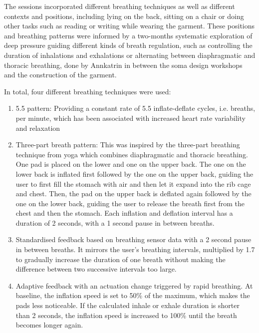 
The sessions incorporated different breathing techniques as well as different contexts and positions, including lying on the back, sitting on a chair or doing other tasks such as reading or writing while wearing the garment. These positions and breathing patterns were informed by a two-months systematic exploration of deep pressure guiding different kinds of breath regulation, such as controlling the duration of inhalations and exhalations or alternating between diaphragmatic and thoracic breathing, done by Annkatrin in between the soma design workshops and the construction of the garment.

In total, four different breathing techniques were used: 
\begin{enumerate}
    \item 5.5 pattern: Providing a constant rate of 5.5 inflate-deflate cycles, i.e. breaths, per minute, which has been associated with increased heart rate variability and relaxation \cite{lin_breathing_2014} 
    \item Three-part breath pattern: This was inspired by the three-part breathing technique from yoga \cite{sengupta_health_2012} which combines diaphragmatic and thoracic breathing. One pad is placed on the lower and one on the upper back. The one on the lower back is inflated first followed by the one on the upper back, guiding the user to first fill the stomach with air and then let it expand into the rib cage and chest. Then, the pad on the upper back is deflated again followed by the one on the lower back, guiding the user to release the breath first from the chest and then the stomach. Each inflation and deflation interval has a duration of 2 seconds, with a 1 second pause in between breaths. 
    \item Standardised feedback based on breathing sensor data with a 2 second pause in between breaths. It mirrors the user’s breathing intervals, multiplied by 1.7 to gradually increase the duration of one breath without making the difference between two successive intervals too large.
    \item Adaptive feedback with an actuation change triggered by rapid breathing. At baseline, the inflation speed is set to 50\% of the maximum, which makes the pads less noticeable. If the calculated inhale or exhale duration is shorter than 2 seconds, the inflation speed is increased to 100\% until the breath becomes longer again.
\end{enumerate}

